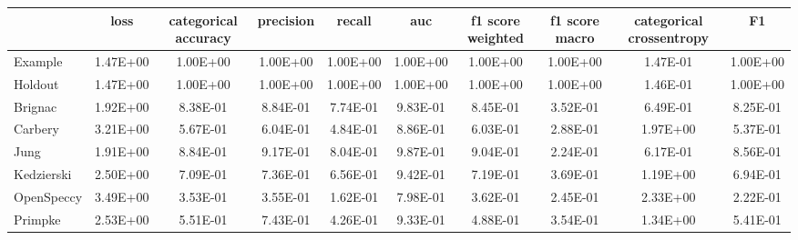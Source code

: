 \begin{tabular}{lccccccccc}
\toprule
 & loss & categorical accuracy & precision & recall & auc & f1 score weighted & f1 score macro & categorical crossentropy & F1 \\
\midrule
Example & 1.47E+00 & 1.00E+00 & 1.00E+00 & 1.00E+00 & 1.00E+00 & 1.00E+00 & 1.00E+00 & 1.47E-01 & 1.00E+00 \\
Holdout & 1.47E+00 & 1.00E+00 & 1.00E+00 & 1.00E+00 & 1.00E+00 & 1.00E+00 & 1.00E+00 & 1.46E-01 & 1.00E+00 \\
Brignac & 1.92E+00 & 8.38E-01 & 8.84E-01 & 7.74E-01 & 9.83E-01 & 8.45E-01 & 3.52E-01 & 6.49E-01 & 8.25E-01 \\
Carbery & 3.21E+00 & 5.67E-01 & 6.04E-01 & 4.84E-01 & 8.86E-01 & 6.03E-01 & 2.88E-01 & 1.97E+00 & 5.37E-01 \\
Jung & 1.91E+00 & 8.84E-01 & 9.17E-01 & 8.04E-01 & 9.87E-01 & 9.04E-01 & 2.24E-01 & 6.17E-01 & 8.56E-01 \\
Kedzierski & 2.50E+00 & 7.09E-01 & 7.36E-01 & 6.56E-01 & 9.42E-01 & 7.19E-01 & 3.69E-01 & 1.19E+00 & 6.94E-01 \\
OpenSpeccy & 3.49E+00 & 3.53E-01 & 3.55E-01 & 1.62E-01 & 7.98E-01 & 3.62E-01 & 2.45E-01 & 2.33E+00 & 2.22E-01 \\
Primpke & 2.53E+00 & 5.51E-01 & 7.43E-01 & 4.26E-01 & 9.33E-01 & 4.88E-01 & 3.54E-01 & 1.34E+00 & 5.41E-01 \\
\bottomrule
\end{tabular}
